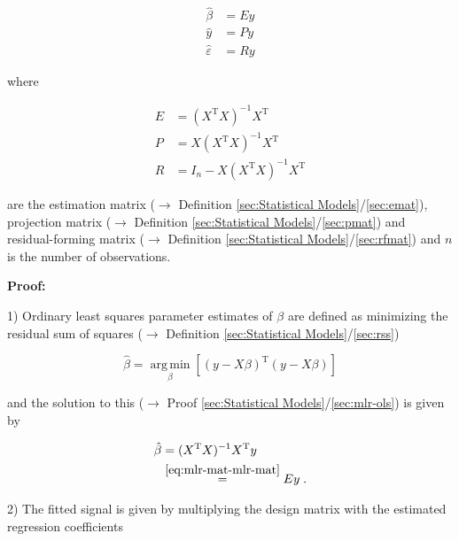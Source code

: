 \documentclass[a4paper,12pt,twoside]{book}
\begin{document}
\begin{equation} \label{eq:mlr-mat-mlr-est}
\begin{split}
\hat{\beta} &= E y \\
\hat{y} &= P y \\
\hat{\varepsilon} &= R y
\end{split}
\end{equation}

where 

\begin{equation} \label{eq:mlr-mat-mlr-mat}
\begin{split}
E &= (X^\mathrm{T} X)^{-1} X^\mathrm{T} \\
P &= X (X^\mathrm{T} X)^{-1} X^\mathrm{T} \\
R &= I_n - X (X^\mathrm{T} X)^{-1} X^\mathrm{T}
\end{split}
\end{equation}

are the estimation matrix ($\rightarrow$ Definition \ref{sec:Statistical Models}/\ref{sec:emat}), projection matrix ($\rightarrow$ Definition \ref{sec:Statistical Models}/\ref{sec:pmat}) and residual-forming matrix ($\rightarrow$ Definition \ref{sec:Statistical Models}/\ref{sec:rfmat}) and $n$ is the number of observations.


\vspace{1em}
\textbf{Proof:}

1) Ordinary least squares parameter estimates of $\beta$ are defined as minimizing the residual sum of squares ($\rightarrow$ Definition \ref{sec:Statistical Models}/\ref{sec:rss})

\begin{equation} \label{eq:mlr-mat-ols}
\hat{\beta} = \operatorname*{arg\,min}_{\beta} \left[ (y-X\beta)^\mathrm{T} (y-X\beta) \right]
\end{equation}

and the solution to this ($\rightarrow$ Proof \ref{sec:Statistical Models}/\ref{sec:mlr-ols}) is given by

\begin{equation} \label{eq:mlr-mat-b-est-qed}
\begin{split}
\hat{\beta} &= (X^\mathrm{T} X)^{-1} X^\mathrm{T} y \\
&\overset{\eqref{eq:mlr-mat-mlr-mat}}{=} E y \; .
\end{split}
\end{equation}

\vspace{1em}
2) The fitted signal is given by multiplying the design matrix with the estimated regression coefficients
\end{document}

